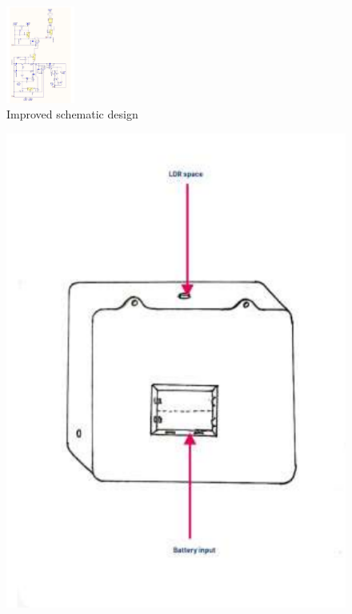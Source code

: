 \documentclass[twocolumn]{article}
\begin{document}
\begin{figure}[h]
\centering
\includegraphics[width=0.2\textwidth]{6.png}
\caption{Improved schematic design}
\end{figure}

\begin{figure}[h]
\centering
\begin{minipage}[b]{0.2\textwidth}
\includegraphics[width=\textwidth]{11.png}
\end{minipage}
\hfill
\begin{minipage}[b]{0.2\textwidth}

\end{minipage}
\end{figure}
\end{document}

